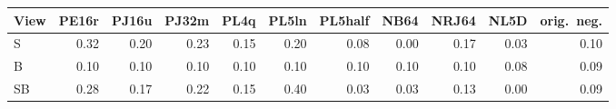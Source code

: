 \begin{tabular}{lrrrrrrrrrr}
\toprule
View & PE16r & PJ16u & PJ32m & PL4q & PL5ln & PL5half & NB64 & NRJ64 & NL5D & orig.\ neg.\\
\midrule
S & 0.32 & 0.20 & 0.23 & 0.15 & 0.20 & 0.08 & 0.00 & 0.17 & 0.03 & 0.10\\
B & 0.10 & 0.10 & 0.10 & 0.10 & 0.10 & 0.10 & 0.10 & 0.10 & 0.08 & 0.09\\
SB & 0.28 & 0.17 & 0.22 & 0.15 & 0.40 & 0.03 & 0.03 & 0.13 & 0.00 & 0.09\\
\bottomrule
\end{tabular}
